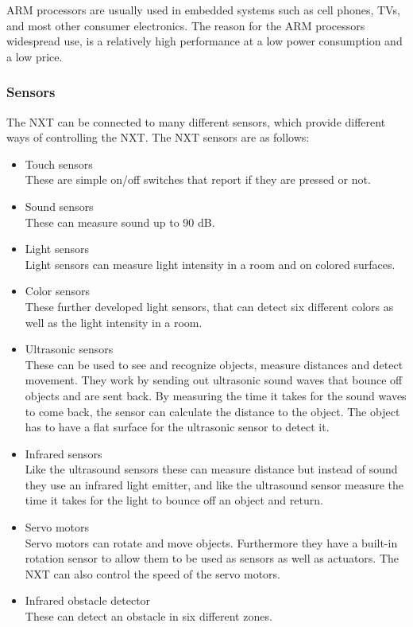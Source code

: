 ARM processors are usually used in embedded systems such as cell phones, TVs, and most other consumer electronics. The reason for the ARM processors widespread use, is a relatively high performance at a low power consumption and a low price.\cite{armarchitecture}

\subsubsection{Sensors}
The NXT can be connected to many different sensors, which provide different ways of controlling the NXT.
The NXT sensors are as follows\cite{nxtspec}:

\begin{itemize}
\item {Touch sensors}\\ These are simple on/off switches that report if they are pressed or not.
\item {Sound sensors} \\ These can measure sound up to 90 dB.
\item {Light sensors} \\ Light sensors can measure light intensity in a room and on colored surfaces.
\item {Color sensors} \\ These further developed light sensors, that can detect six different colors as well as the light intensity in a room.
\item {Ultrasonic sensors} \\ These can be used to see and recognize objects, measure distances and detect movement. They work by sending out ultrasonic sound waves that bounce off objects and are sent back. By measuring the time it takes for the sound waves to come back, the sensor can calculate the distance to the object. The object has to have a flat surface for the ultrasonic sensor to detect it.
\item {Infrared sensors} \\ Like the ultrasound sensors these can measure distance but instead of sound they use an infrared light emitter, and like the ultrasound sensor measure the time it takes for the light to bounce off an object and return.
\item {Servo motors} \\ Servo motors can rotate and move objects. Furthermore they have a built-in rotation sensor to allow them to be used as sensors as well as actuators. The NXT can also control the speed of the servo motors.
\item {Infrared obstacle detector} \\ These can detect an obstacle in six different zones.
\end{itemize}


